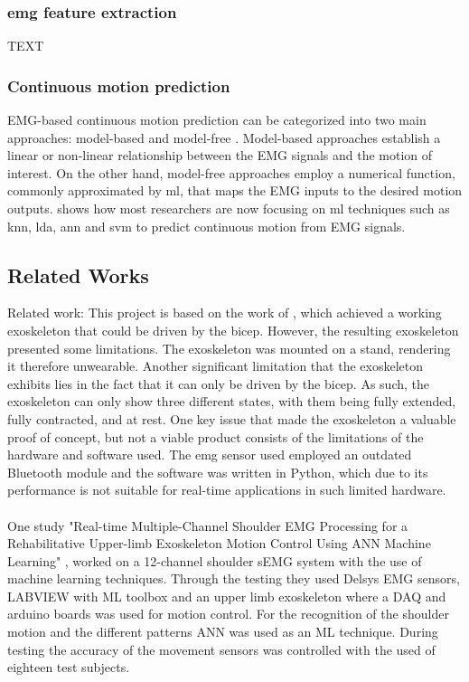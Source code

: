\subsubsection{\acs{emg} feature extraction}

TEXT

\subsubsection{Continuous motion prediction}

EMG-based continuous motion prediction can be categorized into two main approaches: model-based and model-free \cite{EMGprediction}. Model-based approaches
establish a linear or non-linear relationship between the EMG signals and the motion of interest. On the other hand, model-free approaches
employ a numerical function, commonly approximated by \ac{ml}, that maps the EMG inputs to the desired motion outputs. \cite{ANNFuzzy} shows how most 
researchers are now focusing on \ac{ml} techniques such as \ac{knn}, \ac{lda}, \ac{ann} and \ac{svm} to predict continuous motion from EMG signals.


\subsection{Related Works}
Related work: %
This project is based on the work of \cite{AFES}, which achieved a working exoskeleton that could be driven by the bicep. However, the resulting 
exoskeleton presented some limitations. The exoskeleton was mounted on a stand, rendering it therefore unwearable. Another significant limitation 
that the exoskeleton exhibits lies in the fact that it can only be driven by the bicep. As such, the exoskeleton can only show three different states, 
with them being fully extended, fully contracted, and at rest. One key issue that made the exoskeleton a valuable proof of concept, but not a viable 
product consists of the limitations of the hardware and software used. The \acs{emg} sensor used employed an outdated Bluetooth module and the software was 
written in Python, which due to its performance is not suitable for real-time applications in such limited hardware. 
\\\\
One study "Real-time Multiple-Channel Shoulder EMG Processing for a Rehabilitative Upper-limb Exoskeleton Motion Control Using ANN Machine Learning" \cite{shoulderexo},
worked on a 12-channel shoulder sEMG system with the use of machine learning techniques. Through the testing they used Delsys EMG sensors, LABVIEW with ML toolbox and an 
upper limb exoskeleton where a DAQ and arduino boards was used for motion control. For the recognition of the shoulder motion and the different patterns ANN was used as an 
ML technique. During testing the accuracy of the movement sensors was controlled with the used of eighteen test subjects.